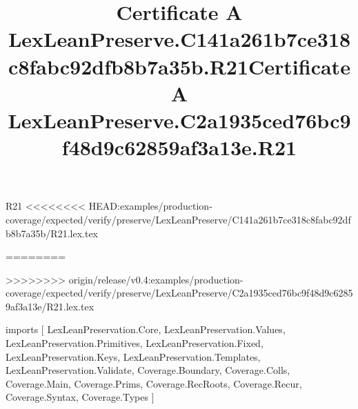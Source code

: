\begin{lexlean}{R21}
<<<<<<<< HEAD:examples/production-coverage/expected/verify/preserve/LexLeanPreserve/C141a261b7ce318c8fabc92dfb8b7a35b/R21.lex.tex
\title{Certificate A LexLeanPreserve.C141a261b7ce318c8fabc92dfb8b7a35b.R21}
========
\title{Certificate A LexLeanPreserve.C2a1935ced76bc9f48d9c62859af3a13e.R21}
>>>>>>>> origin/release/v0.4:examples/production-coverage/expected/verify/preserve/LexLeanPreserve/C2a1935ced76bc9f48d9c62859af3a13e/R21.lex.tex
\begin{coremodule}
imports [
  LexLeanPreservation.Core,
  LexLeanPreservation.Values,
  LexLeanPreservation.Primitives,
  LexLeanPreservation.Fixed,
  LexLeanPreservation.Keys,
  LexLeanPreservation.Templates,
  LexLeanPreservation.Validate,
  Coverage.Boundary,
  Coverage.Colls,
  Coverage.Main,
  Coverage.Prims,
  Coverage.RecRoots,
  Coverage.Recur,
  Coverage.Syntax,
  Coverage.Types
]


\end{coremodule}
\end{lexlean}
